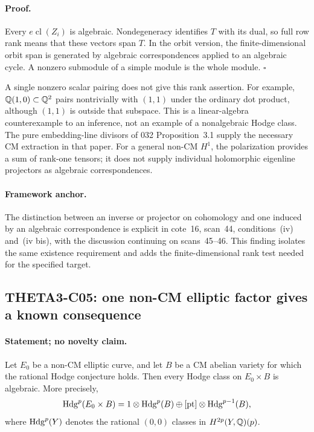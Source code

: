 \paragraph{Proof.}
Every $e\operatorname{cl}(Z_i)$ is algebraic. Nondegeneracy
identifies $T$ with its dual, so full row rank means that these
vectors span $T$. In the orbit version, the finite-dimensional
orbit span is generated by algebraic correspondences applied to an
algebraic cycle. A nonzero submodule of a simple module is the whole
module. $\square$

A single nonzero scalar pairing does not give this rank assertion.
For example, $\mathbb Q(1,0)\subset\mathbb Q^2$ pairs nontrivially with $(1,1)$
under the ordinary dot product, although $(1,1)$ is outside that
subspace. This is a linear-algebra counterexample to an inference,
not an example of a nonalgebraic Hodge class. The pure embedding-line
divisors of 032 Proposition~3.1 supply the necessary CM extraction
in that paper. For a general non-CM $H^1$, the polarization provides
a sum of rank-one tensors; it does not supply individual
holomorphic eigenline projectors as algebraic correspondences.

\paragraph{Framework anchor.}
The distinction between an inverse or projector on cohomology and one
induced by an algebraic correspondence is explicit in cote~16,
scan~44, conditions~(iv) and~(iv bis), with the discussion continuing on
scans~45--46.  This finding isolates the same existence requirement and
adds the finite-dimensional rank test needed for the specified target.

\subsection{THETA3-C05: one non-CM elliptic factor gives a known consequence}\label{C05}

\paragraph{Statement; no novelty claim.}
Let $E_0$ be a non-CM elliptic curve, and let $B$ be a CM abelian
variety for which the rational Hodge conjecture holds. Then every
Hodge class on $E_0\times B$ is algebraic. More precisely,
\[
 \operatorname{Hdg}^p(E_0\times B)
 =1\otimes\operatorname{Hdg}^p(B)
 \oplus[\mathrm{pt}]\otimes\operatorname{Hdg}^{p-1}(B),
\]
where $\operatorname{Hdg}^p(Y)$ denotes the rational $(0,0)$ classes in
$H^{2p}(Y,\mathbb Q)(p)$.

